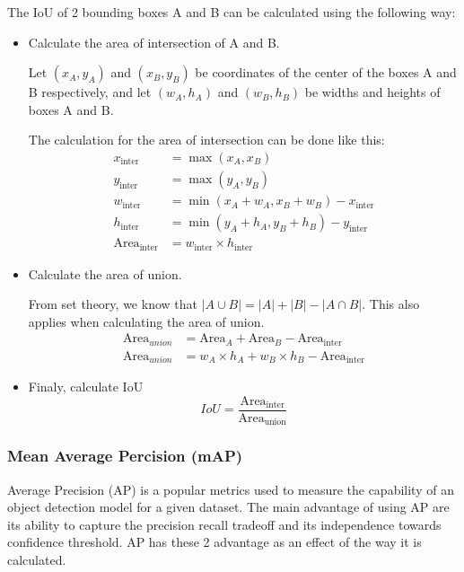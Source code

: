   The IoU of 2 bounding boxes A and B can be calculated using the following way:
  \begin{itemize}
    \item Calculate the area of intersection of A and B. 

    Let $(x_A,y_A)$ and $(x_B,y_B)$ be coordinates of the center of the boxes A and B respectively,
    and let $(w_A,h_A)$ and $(w_B,h_B)$ be widths and heights of boxes A and B.

    The calculation for the area of intersection can be done like this:
    \begin{align*}
      x_{\text{{inter}}} &= \max(x_A, x_B) \\
      y_{\text{{inter}}} &= \max(y_A, y_B) \\
      w_{\text{{inter}}} &= \min(x_A + w_A, x_B + w_B) - x_{\text{{inter}}} \\
      h_{\text{{inter}}} &= \min(y_A + h_A, y_B + h_B) - y_{\text{{inter}}} \\
      \text{Area}_{\text{inter}} &= w_{\text{{inter}}} \times h_{\text{{inter}}}
    \end{align*}
    \item Calculate the area of union.

    From set theory, we know that $|A \cup B| =|A| + |B| - |A \cap B| $.
    This also applies when calculating the area of union.
    \begin{align*}
      \text{Area}_{union} &= \text{Area}_A + \text{Area}_B - \text{Area}_{\text{inter}}\\
      \text{Area}_{union} &= w_A\times h_A + w_B\times h_B  - \text{Area}_{\text{inter}}
    \end{align*}
    \item Finaly, calculate IoU
    \begin{equation}
      IoU = \frac{\text{Area}_{\text{inter}}}{\text{Area}_{\text{union}}}
    \end{equation}
  \end{itemize} 

  \subsubsection{Mean Average Percision (mAP)}
  Average Precision (AP) is a popular metrics used to measure the capability of an object detection model
  for a given dataset. The main advantage of using AP are its ability to capture the precision recall
  tradeoff and its independence towards confidence threshold. AP has these 2 advantage as an effect of the way 
  it is calculated.


